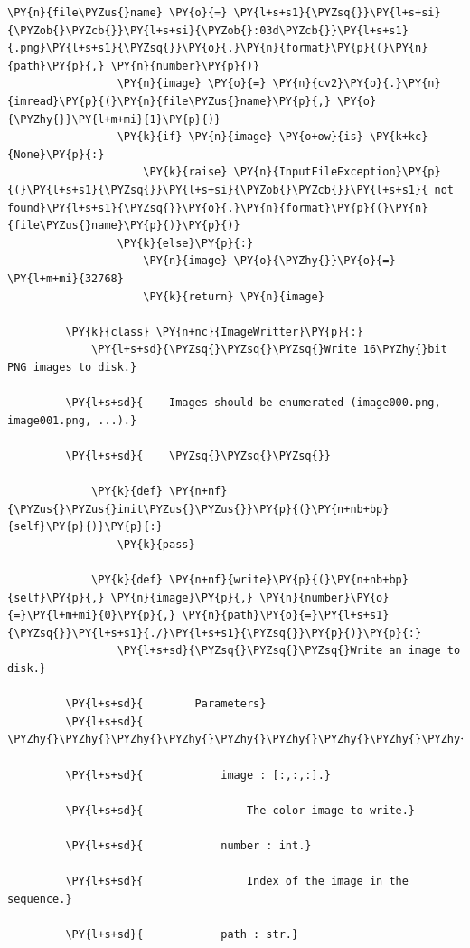 \begin{Verbatim}[commandchars=\\\{\}]
                 \PY{n}{file\PYZus{}name} \PY{o}{=} \PY{l+s+s1}{\PYZsq{}}\PY{l+s+si}{\PYZob{}\PYZcb{}}\PY{l+s+si}{\PYZob{}:03d\PYZcb{}}\PY{l+s+s1}{.png}\PY{l+s+s1}{\PYZsq{}}\PY{o}{.}\PY{n}{format}\PY{p}{(}\PY{n}{path}\PY{p}{,} \PY{n}{number}\PY{p}{)}
                 \PY{n}{image} \PY{o}{=} \PY{n}{cv2}\PY{o}{.}\PY{n}{imread}\PY{p}{(}\PY{n}{file\PYZus{}name}\PY{p}{,} \PY{o}{\PYZhy{}}\PY{l+m+mi}{1}\PY{p}{)}
                 \PY{k}{if} \PY{n}{image} \PY{o+ow}{is} \PY{k+kc}{None}\PY{p}{:}
                     \PY{k}{raise} \PY{n}{InputFileException}\PY{p}{(}\PY{l+s+s1}{\PYZsq{}}\PY{l+s+si}{\PYZob{}\PYZcb{}}\PY{l+s+s1}{ not found}\PY{l+s+s1}{\PYZsq{}}\PY{o}{.}\PY{n}{format}\PY{p}{(}\PY{n}{file\PYZus{}name}\PY{p}{)}\PY{p}{)}
                 \PY{k}{else}\PY{p}{:}
                     \PY{n}{image} \PY{o}{\PYZhy{}}\PY{o}{=} \PY{l+m+mi}{32768}
                     \PY{k}{return} \PY{n}{image}
         
         \PY{k}{class} \PY{n+nc}{ImageWritter}\PY{p}{:}
             \PY{l+s+sd}{\PYZsq{}\PYZsq{}\PYZsq{}Write 16\PYZhy{}bit PNG images to disk.}
         
         \PY{l+s+sd}{    Images should be enumerated (image000.png, image001.png, ...).}
         
         \PY{l+s+sd}{    \PYZsq{}\PYZsq{}\PYZsq{}}
         
             \PY{k}{def} \PY{n+nf}{\PYZus{}\PYZus{}init\PYZus{}\PYZus{}}\PY{p}{(}\PY{n+nb+bp}{self}\PY{p}{)}\PY{p}{:}
                 \PY{k}{pass}
         
             \PY{k}{def} \PY{n+nf}{write}\PY{p}{(}\PY{n+nb+bp}{self}\PY{p}{,} \PY{n}{image}\PY{p}{,} \PY{n}{number}\PY{o}{=}\PY{l+m+mi}{0}\PY{p}{,} \PY{n}{path}\PY{o}{=}\PY{l+s+s1}{\PYZsq{}}\PY{l+s+s1}{./}\PY{l+s+s1}{\PYZsq{}}\PY{p}{)}\PY{p}{:}
                 \PY{l+s+sd}{\PYZsq{}\PYZsq{}\PYZsq{}Write an image to disk.}
         
         \PY{l+s+sd}{        Parameters}
         \PY{l+s+sd}{        \PYZhy{}\PYZhy{}\PYZhy{}\PYZhy{}\PYZhy{}\PYZhy{}\PYZhy{}\PYZhy{}\PYZhy{}\PYZhy{}}
         
         \PY{l+s+sd}{            image : [:,:,:].}
         
         \PY{l+s+sd}{                The color image to write.}
         
         \PY{l+s+sd}{            number : int.}
         
         \PY{l+s+sd}{                Index of the image in the sequence.}
         
         \PY{l+s+sd}{            path : str.}
         

\end{Verbatim}
